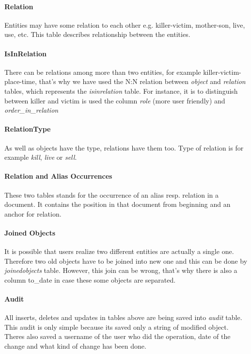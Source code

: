 \paragraph{Relation} Entities may have some relation to each other e.g. killer-victim,
mother-son, live, use, etc. This table describes relationship between the entities. 

\paragraph{IsInRelation} There can be relations among more than two entities, for example 
killer-victim-place-time, that's why we have used the N:N relation 
between \emph{object} and \emph{relation} tables, which represents the \emph{isinrelation} 
table. For instance, it is to distinguish between killer and victim is used the column \emph{role} 
(more user friendly) and \emph{order\_{}in\_{}relation} %


\paragraph{RelationType} As well as objects have the type, relations have them too. 
Type of relation is for example \emph{kill}, \emph{live} or \emph{sell}.

\paragraph{Relation and Alias Occurrences} These two tables stands for the occurrence of an 
alias resp. relation in a document. It contains the position in that document from beginning 
and an anchor for relation.

\paragraph{Joined Objects} It is possible that users realize two different entities are actually 
a single one. Therefore two old objects have to be joined into new one and this can be done by 
\emph{joinedobjects} table. However, this join can be wrong, that's why there is also a column 
to\_{}date in case these some objects are separated.

\paragraph{Audit} All inserts, deletes and updates in tables above are being saved into \emph{audit} 
table. This audit is only simple because its saved only a string of modified object. Theres also 
saved a username of the user who did the operation, date of the change and what kind of change has 
been done.
 
